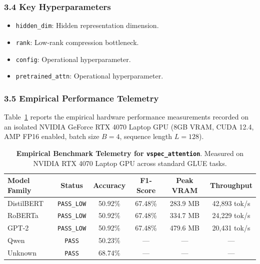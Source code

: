 \subsubsection*{3.4 Key Hyperparameters}
\begin{itemize}
    \item \texttt{hidden\_dim}: Hidden representation dimension.
    \item \texttt{rank}: Low-rank compression bottleneck.
    \item \texttt{config}: Operational hyperparameter.
    \item \texttt{pretrained\_attn}: Operational hyperparameter.
\end{itemize}

\subsubsection*{3.5 Empirical Performance Telemetry}
Table~\ref{tab:telemetry_vspec_attention} reports the empirical hardware performance measurements recorded on an isolated NVIDIA GeForce RTX 4070 Laptop GPU (8GB VRAM, CUDA 12.4, AMP FP16 enabled, batch size $B=4$, sequence length $L=128$).

\begin{table}[h]
\centering
\small
\caption{\textbf{Empirical Benchmark Telemetry for \texttt{vspec\_attention}}. Measured on NVIDIA RTX 4070 Laptop GPU across standard GLUE tasks.}
\label{tab:telemetry_vspec_attention}
\begin{tabular*}{\columnwidth}{@{\extracolsep{\fill}}lccccc}
\toprule
\textbf{Model Family} & \textbf{Status} & \textbf{Accuracy} & \textbf{F1-Score} & \textbf{Peak VRAM} & \textbf{Throughput} \\
\midrule
DistilBERT & \texttt{PASS\_LOW} & 50.92\% & 67.48\% & 283.9 MB & 42,893 tok/s \\
RoBERTa & \texttt{PASS\_LOW} & 50.92\% & 67.48\% & 334.7 MB & 24,229 tok/s \\
GPT-2 & \texttt{PASS\_LOW} & 50.92\% & 67.48\% & 479.6 MB & 20,431 tok/s \\
Qwen & \texttt{PASS} & 50.23\% & --- & --- & --- \\
Unknown & \texttt{PASS} & 68.74\% & --- & --- & --- \\
\bottomrule
\end{tabular*}
\end{table}


